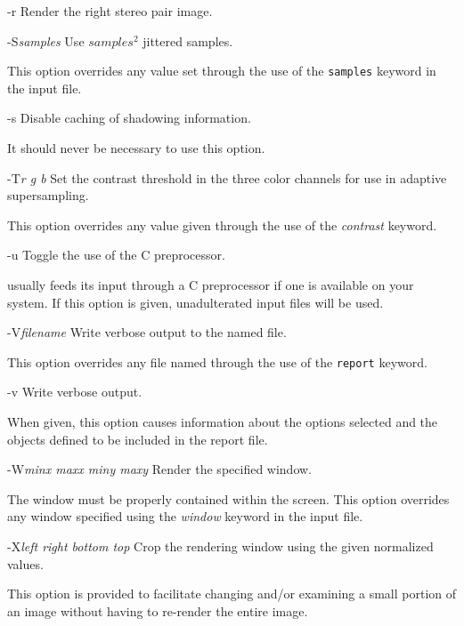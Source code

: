 \begin{defkey}{-r}{}
	Render the right stereo pair image.
\end{defkey}

\begin{defkey}{-S}{{\em samples}}
	Use $samples^2$ jittered samples.
\end{defkey}
This option overrides any value set through the use of
the {\tt samples} keyword in the input file.

\begin{defkey}{-s}{}
	Disable caching of  shadowing information.
\end{defkey}
It should never be necessary to use this option.

\begin{defkey}{-T}{{\em r g b}}
	Set the contrast threshold in the three
	color channels for use in adaptive supersampling.
\end{defkey}
This option overrides any value given through the use of
the {\em contrast} keyword.

\begin{defkey}{-u}{}
	Toggle the use of the C preprocessor.
\end{defkey}
{\Rayshade} usually feeds its input through a
C preprocessor if one is available on your system.
If this option is given, unadulterated input files will
be used.

\begin{defkey}{-V}{{\em	filename}}
	Write verbose output to the named file.
\end{defkey}
This option overrides any file named through the use of
the {\tt report} keyword.

\begin{defkey}{-v}{}
	Write verbose output.
\end{defkey}
When given, this option causes information about the options
selected and the objects defined to be included in the
report file.

\begin{defkey}{-W}{{\em minx maxx miny maxy}}
	Render the specified window.
\end{defkey}
The window must be properly contained within the screen.  This
option overrides any window specified using the {\em window} keyword
in the input file.

\begin{defkey}{-X}{{\em left right bottom top}}
	Crop the rendering window using the given normalized values.
\end{defkey}
This option is provided to facilitate changing and/or examining a
small portion of an image without having to re-render the entire
image.
